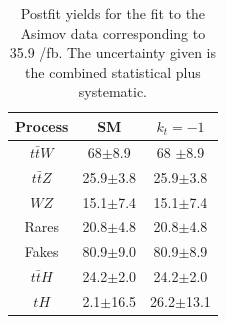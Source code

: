 \begin{linenumbers}
\begin{table}[ht!]
	\centering
	\caption{Postfit  yields for the fit to the Asimov data corresponding to 35.9 /fb. The uncertainty given is the combined statistical plus systematic.}
\begin{tabular}{ccc}
	\hline
	Process  & SM    & $k_t=-1$ \\
	\hline
$t\bar{t}W$  &  68$\pm$8.9& 68 $\pm$8.9 \\
	$t\bar{t}Z$  & 25.9$\pm$3.8&25.9$\pm$3.8\\
$WZ$ &  15.1$\pm$7.4& 15.1$\pm$7.4\\
Rares &  20.8$\pm$4.8& 20.8$\pm$4.8 \\
	Fakes  &  80.9$\pm$9.0&  80.9$\pm$8.9 \\
	$t\bar{t}H$  &   24.2$\pm$2.0 &  24.2$\pm$2.0 \\
\hline
$tH$&  2.1$\pm$16.5 &26.2$\pm$13.1 
\end{tabular}
\label{table1}
\end{table}


\end{linenumbers}
